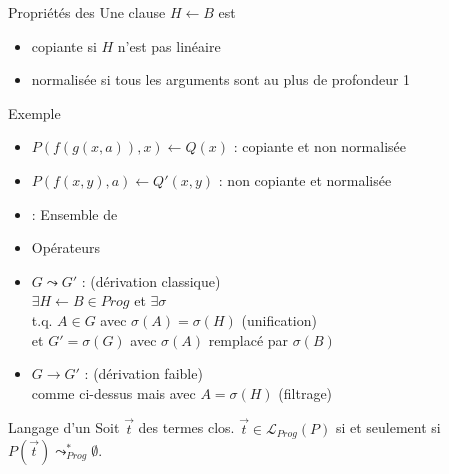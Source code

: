 \begin{frame}{\csclause}
  \begin{block}{Propriétés des \csclauses}
    Une clause $H \leftarrow B$ est
    \pause
    \begin{itemize}[<+->]
    \item copiante si $H$ n'est pas linéaire
    \item normalisée si tous les arguments sont au plus de profondeur 1
    \end{itemize}
  \end{block}
  \begin{exampleblock}{Exemple}
    \begin{itemize}
     \item $P(f(g(x,a)),x) \leftarrow Q(x)$ : copiante et non normalisée
     \item $P(f(x,y),a) \leftarrow Q'(x,y)$ : non copiante et normalisée
    \end{itemize}
  \end{exampleblock}
\end{frame}

\begin{frame}{\csprogramme}
  \begin{itemize}[<+->]
  \item \csprogramme : Ensemble de \csclauses
  \item Opérateurs
  \end{itemize}
  \begin{block}{}
    \begin{itemize}[<+->]
    \item $G \leadsto G'$ : (dérivation classique) \\
      $\exists H \leftarrow B \in Prog$ et $\exists \sigma$ \\
      t.q. $A \in G$ avec $\sigma(A) = \sigma(H)$ (unification)\\
      et $G' = \sigma(G)$ avec $\sigma(A)$ remplacé par $\sigma(B)$
    \item $G \rightarrow G'$ : (dérivation faible) \\
      comme ci-dessus mais avec $A = \sigma(H)$ (filtrage)
    \end{itemize}
  \end{block}
  \begin{block}{Langage d'un \csprogramme}
    Soit $\vec{t}$ des termes clos.
    $\vec{t} \in \mathcal{L}_{Prog}(P)$ si et seulement si $P(\vec{t}) \leadsto^*_{Prog} \emptyset$.
  \end{block}
\end{frame}


